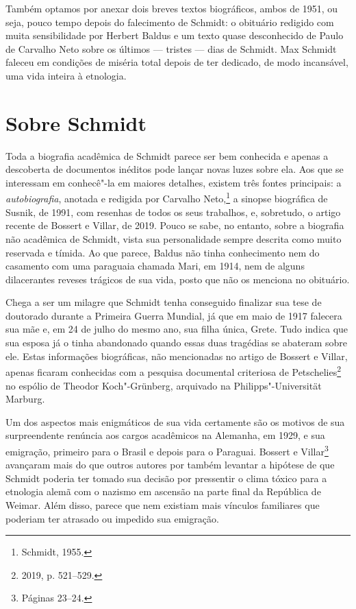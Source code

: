 Também optamos por anexar dois breves textos biográficos, ambos de
1951, ou seja, pouco tempo depois do falecimento de Schmidt:
o obituário redigido com muita sensibilidade por Herbert Baldus e um
texto quase desconhecido de Paulo de Carvalho Neto sobre os últimos ---
tristes --- dias de Schmidt. Max Schmidt faleceu em condições de miséria
total depois de ter dedicado, de modo incansável, uma vida inteira à
etnologia.

\section{Sobre Schmidt}

Toda a biografia acadêmica de Schmidt parece ser bem %
conhecida e apenas a descoberta de documentos inéditos pode lançar novas luzes sobre
ela. Aos que se interessam em conhecê"-la em maiores detalhes, existem três
fontes principais: a \textit{autobiografia}, anotada e redigida por Carvalho
Neto,\footnote{Schmidt, 1955.} a sinopse biográfica de Susnik, de 1991, com
resenhas de todos os seus trabalhos, e, sobretudo, o artigo
recente de Bossert e Villar, de 2019. Pouco se sabe, no entanto, sobre a
biografia não acadêmica de Schmidt, vista sua personalidade sempre descrita como muito reservada e tímida. 
Ao que parece, Baldus não tinha
conhecimento nem do casamento com uma paraguaia chamada Mari, em 1914,
nem de alguns dilacerantes reveses trágicos de sua vida, posto que
não os menciona no obituário.

Chega a ser um milagre que Schmidt tenha conseguido finalizar sua tese de
doutorado durante a Primeira Guerra Mundial, já que em maio de 1917
falecera sua mãe e, em 24 de julho do mesmo ano, sua filha única, Grete.
Tudo indica que sua esposa já o tinha abandonado quando essas duas
tragédias se abateram sobre ele. Estas informações biográficas, não
mencionadas no artigo de Bossert e Villar, apenas ficaram
conhecidas com a pesquisa documental criteriosa de Petschelies\footnote{2019, p.
521--529.} no espólio de Theodor Koch"-Grünberg, arquivado na
Philipps"-Universität Marburg.

Um dos aspectos mais enigmáticos de sua vida certamente são os motivos
de sua surpreendente renúncia aos cargos acadêmicos na Alemanha, em
1929, e sua emigração, primeiro para o Brasil e depois para o Paraguai.
Bossert e Villar\footnote{Páginas 23--24.} avançaram mais do que outros autores
por também levantar a hipótese de que Schmidt poderia ter tomado sua
decisão por pressentir o clima tóxico para a etnologia alemã com o
nazismo em ascensão na parte final da República de Weimar. Além disso,
parece que nem existiam mais vínculos familiares que poderiam ter
atrasado ou impedido sua emigração.

